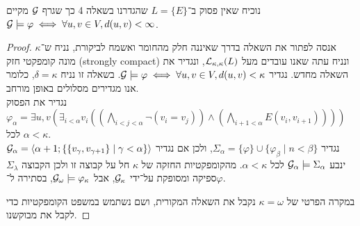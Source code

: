 \question{}
נוכיח שאין פסוק ב־$L = \{ E \}$ שהגדרנו בשאלה 4 כך שגרף $\mathcal{G}$ מקיים $\mathcal{G} \models \varphi \iff \forall u, v \in V, d(u, v) < \infty$.
\begin{proof}
	אנסה לפתור את השאלה בדרך שאיננה חלק מהחומר ואשמח לביקורת,
	נניח ש־$\kappa$ מונה קומפקטי חזק (strongly compact) ונניח עתה שאנו עובדים מעל $\mathcal{L}_{\kappa, \kappa}(L)$, ונגדיר את השאלה מחדש.
	נגדיר $\mathcal{G} \models \varphi \iff \forall u, v \in V, d(u, v) < \kappa$.
	בשאלה זו נניח $\delta = \kappa$, כלומר אנו מגדירים מסלולים באופן מורחב. \\
	נגדיר את הפסוק $\varphi_\alpha = \exists u, v (\exists_{i < \alpha} v_i ((\bigwedge_{i < j < \alpha} \lnot (v_i = v_j)) \land (\bigwedge_{i + 1 < \alpha} E(v_i, v_{i + 1}))))$ לכל $\alpha < \kappa$. \\
	נגדיר $\Sigma_\alpha = \{ \varphi \} \cup \{ \varphi_\beta \mid n < \beta \}$,
	ולכן אם נגדיר $\mathcal{G}_\alpha = \langle \alpha + 1; \{ \{ v_\gamma, v_{\gamma + 1} \} \mid \gamma < \alpha \} \rangle$ ינבע $\mathcal{G}_\alpha \models \Sigma_\alpha$ לכל $\alpha < \kappa$.
	מהקומפקטיות החזקה של $\kappa$ חל על קבוצה זו ולכן הקבוצה $\Sigma_\lambda$ ספיקה ומסופקת על־ידי $\mathcal{G}_\kappa$, אבל $\mathcal{G}_\omega \models \varphi_\kappa$, בסתירה ל־$\varphi$.

	במקרה הפרטי של $\kappa = \omega$ נקבל את השאלה המקורית, ושם נשתמש במשפט הקומפקטיות כדי לקבל את מבוקשנו.
\end{proof}


